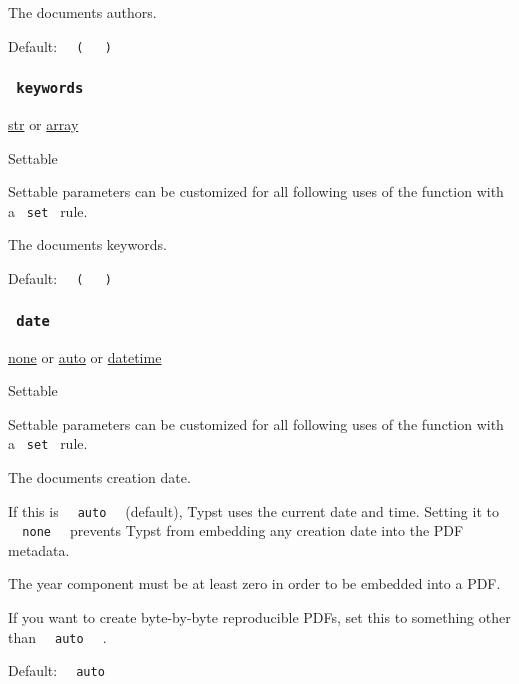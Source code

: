 The document\textquotesingle s authors.

Default:
\texttt{\ }{\texttt{\ (\ }}\texttt{\ }{\texttt{\ )\ }}\texttt{\ }

\subsubsection{\texorpdfstring{\texttt{\ keywords\ }}{ keywords }}\label{parameters-keywords}

\href{/docs/reference/foundations/str/}{str} {or}
\href{/docs/reference/foundations/array/}{array}

{{ Settable }}

\label{parameters-keywords-settable-tooltip}
Settable parameters can be customized for all following uses of the
function with a \texttt{\ set\ } rule.

The document\textquotesingle s keywords.

Default:
\texttt{\ }{\texttt{\ (\ }}\texttt{\ }{\texttt{\ )\ }}\texttt{\ }

\subsubsection{\texorpdfstring{\texttt{\ date\ }}{ date }}\label{parameters-date}

\href{/docs/reference/foundations/none/}{none} {or}
\href{/docs/reference/foundations/auto/}{auto} {or}
\href{/docs/reference/foundations/datetime/}{datetime}

{{ Settable }}

\label{parameters-date-settable-tooltip}
Settable parameters can be customized for all following uses of the
function with a \texttt{\ set\ } rule.

The document\textquotesingle s creation date.

If this is \texttt{\ }{\texttt{\ auto\ }}\texttt{\ } (default), Typst
uses the current date and time. Setting it to
\texttt{\ }{\texttt{\ none\ }}\texttt{\ } prevents Typst from embedding
any creation date into the PDF metadata.

The year component must be at least zero in order to be embedded into a
PDF.

If you want to create byte-by-byte reproducible PDFs, set this to
something other than \texttt{\ }{\texttt{\ auto\ }}\texttt{\ } .

Default: \texttt{\ }{\texttt{\ auto\ }}\texttt{\ }

\href{/docs/reference/model/cite/}{\pandocbounded{}}

